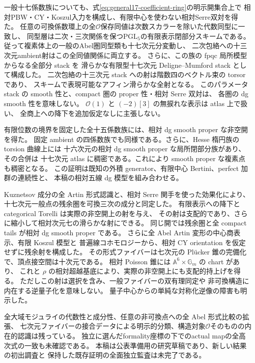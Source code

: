 \documentclass[11pt,a4paper]{ltjsarticle}
\numberwithin{equation}{section}
\newcommand{\PGL}{\mathrm{PGL}}
\begin{document}
一般十七係数族についても、式\eqref{eq:general17-coefficient-ring}の明示開集合上で
相対PBW・CY・Koszul入力を構成し、有限中心を使わない相対Serre双対を得た。
任意の可換係数環上の全$\mathcal O$保存同値は次数スカラーを除いた代数同型に一致し、
同型層は二次・三次関係を保つ$\PGL_5$の有限表示閉部分スキームである。
従って複素体上の一般のAbel圏同型類も十七次元分変動し、
二次包絡への十三次元ambient射はこの全同値関係に両立する。
さらに、この族の fpqc 局所模型からなる全部分 stack を
滑らかな有限型十七次元 Deligne--Mumford stack として構成した。
二次包絡の十三次元 stack への射は階数四のベクトル束の torsor であり、
スキームで表現可能なアフィン滑らかな全射となる。
このパラメータ stack の smooth 性と、compact 圏の proper 性・相対 Serre 双対は、
各圏の dg smooth 性を意味しない。
$\mathcal O(1)$ と $(-2)[3]$ の無捩れな表示は atlas 上で扱い、
全商上への降下を追加仮定なしに主張しない。

有限位数の境界を固定した全十五係数族には、相対 dg smooth proper な非空開を得た。
固定 ambient の四係数族でも同様である。さらに、Hesse 楕円族の torsion 曲線上には
十六次元の相対 dg smooth proper な局所閉部分族があり、その合併は
十七次元 atlas に稠密である。これにより smooth proper な複素点も稠密となる。
この証明は既知の外積 generator、有限中心 Bertini、perfect 加群の連続性と、
本稿の相対五線 dg 模型を組み合わせる。

Kuznetsov 成分の全 Artin 形式認識と、相対 Serre 関手を使った効果化により、
十七次元一般点の残余圏を可換三次の成分と同定した。
有限表示への降下と categorical Torelli は実際の非空開上の射を与え、
その射は支配的であり、さらに縮小して相対次元七の滑らかな射にできる。
同じ開では残余圏と全 compact tails が相対 dg smooth proper である。
さらに全 Abel Artin 変形の中心商表示、有限 Koszul 模型と
普遍線コホモロジーから、相対 CY orientation を仮定せずに残余射を構成した。
その形式ファイバーは七次元の Pl\"ucker 錐の完備化で、頂点接空間は十次元である。
相対 Poisson 錐には $\mathbb A^6\times\mathbb G_m$ の chart があり、
これと $\rho$ の相対超越基底により、実際の非空開上にも支配的持上げを得る。
ただしこの射は選択を含み、一般ファイバーの双有理同定や
非可換構造に内在する逆量子化を意味しない。
量子中心からの単純な対称化逆像の障害も明示した。

全大域モジュライの代数性と成分性、任意の非可換点への全 Abel 形式比較の拡張、
七次元ファイバーの接合データによる明示的分類、構造対象$\mathcal O$そのものの内在的認識は残っている。
独立に選んだformality座標の下でのactual mapの全高次式の一致も未確認である。
本稿は公表準備用の研究草稿であり、新しい結果の初出調査と
保持した既存証明の全面独立監査は未完了である。
\end{document}
